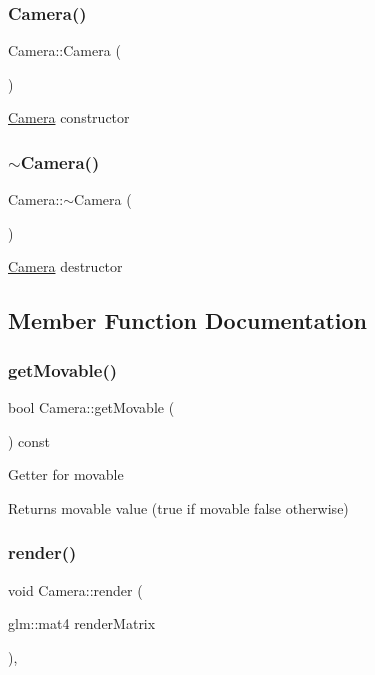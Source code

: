 \subsubsection{\texorpdfstring{Camera()}{Camera()}}
{\footnotesize\ttfamily Camera\+::\+Camera (\begin{DoxyParamCaption}{ }\end{DoxyParamCaption})}

\hyperlink{classCamera}{Camera} constructor \mbox{\label{classCamera_ad1897942d0ccf91052386388a497349f}} 
\subsubsection{\texorpdfstring{$\sim$\+Camera()}{~Camera()}}
{\footnotesize\ttfamily Camera\+::$\sim$\+Camera (\begin{DoxyParamCaption}{ }\end{DoxyParamCaption})\hspace{0.3cm}{\ttfamily [virtual]}}

\hyperlink{classCamera}{Camera} destructor 

\subsection{Member Function Documentation}
\mbox{\label{classCamera_a5140fa7588dab50da4d932ab32baf7f3}} 
\subsubsection{\texorpdfstring{get\+Movable()}{getMovable()}}
{\footnotesize\ttfamily bool Camera\+::get\+Movable (\begin{DoxyParamCaption}{ }\end{DoxyParamCaption}) const}

Getter for movable \begin{DoxyReturn}{Returns}
movable value (true if movable false otherwise) 
\end{DoxyReturn}
\mbox{\label{classCamera_adb0f3d1a0119a86ca7d68e54468b8eef}} 
\subsubsection{\texorpdfstring{render()}{render()}}
{\footnotesize\ttfamily void Camera\+::render (\begin{DoxyParamCaption}\item[{glm\+::mat4}]{render\+Matrix }\end{DoxyParamCaption})\hspace{0.3cm}{\ttfamily [override]}, {\ttfamily [virtual]}}

